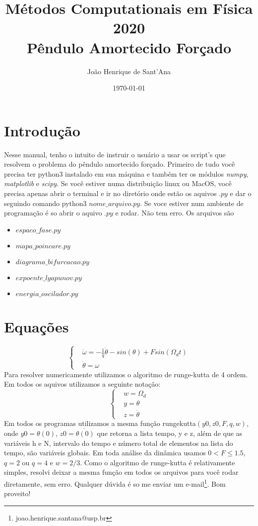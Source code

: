 \documentclass[a4paper,11pt]{article}
\date{\today}
\title{Métodos Computationais em Física 2020\\ Pêndulo Amortecido Forçado} %
\author{João Henrique de Sant'Ana} %
\begin{document}
  

\maketitle
\section*{Introdução}
Nesse manual, tenho o intuito de instruir o usuário a usar os script's que resolvem o problema do pêndulo amortecido forçado. Primeiro de tudo você precisa ter python3 instalado em sua máquina e também ter os módulos \textit{numpy}, \textit{matplotlib} e \textit{scipy}. Se você estiver numa distribuição linux ou MacOS, você precisa apenas abrir o terminal e ir no diretório onde estão os aquivos $.py$ e dar o seguindo comando python3 $nome\_arquivo.py$. Se voce estiver num ambiente de programação é so abrir o aquivo $.py$ e rodar. Não tem erro. Os arquivos são
\begin{itemize}
	\item $espaco\_fase.py$
	\item $mapa\_poincare.py$
	\item $diagrama\_bifurcacao.py$
	\item $expoente\_lyapunov.py$
	\item $energia\_oscilador.py$
\end{itemize}
\section*{Equações}
 \begin{equation}\label{eq:equação_pêndulo_numerica}
        \begin{cases}
        &\dot{\omega}= -\frac{1}{q}\dot{\theta} -sin(\theta) + Fsin(\Omega_{d}t)\\
        &\dot{\theta}=\omega
        \end{cases}
    \end{equation}  
Para resolver numericamente utilizamos o algoritmo de runge-kutta de 4 ordem. Em todos os aquivos utilizamos a seguinte notação:
\begin{equation}\label{eq:notação}
        \begin{cases}
        & w = \Omega_{d}\\
        & y = \theta\\
        & z = \dot{\theta}
        \end{cases}
\end{equation}
Em todos os programas utilizamos a mesma função rungekutta$(y0,z0,F,q,w)$, onde $y0=\theta(0)$, $z0=\dot{\theta(0)}$ que retorna a lista tempo, y e z, além de que as variáveis h e N, intervalo do tempo e número total de elementos na lista do tempo, são variáveis globais. Em toda análise da dinâmica usamos $0<F\leq1.5$, $q=2$ ou $q=4$ e $w=2/3$. Como o algoritmo de runge-kutta é relativamente simples, resolvi deixar a mesma função em todos os arquivos para você rodar diretamente, sem erro. Qualquer dúvida é so me enviar um e-mail\footnote{joao.henrique.santana@usp.br}. Bom proveito!
\end{document}
